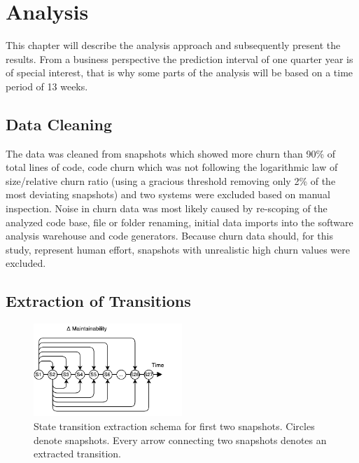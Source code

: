 \section{Analysis}
\label{sec:analysis}
This chapter will describe the analysis approach and subsequently present the results. From a business perspective the prediction interval of one quarter year is of special interest, that is why some parts of the analysis will be based on a time period of 13 weeks.

\subsection{Data Cleaning}
The data was cleaned from snapshots which showed more churn than 90\% of total lines of code, code churn which was not following the logarithmic law of size/relative churn ratio (using a gracious threshold removing only 2\% of the most deviating snapshots) and two systems were excluded based on manual inspection. Noise in churn data was most likely caused by re-scoping of the analyzed code base, file or folder renaming, initial data imports into the software analysis warehouse and code generators. Because churn data should, for this study, represent human effort, snapshots with unrealistic high churn values were excluded.

\subsection{Extraction of Transitions}

\begin{figure}[htbp!]
  \label{schema}
  \centering
  \includegraphics[width=0.50\textwidth]{figs/extraction.pdf}
  \caption{State transition extraction schema for first two snapshots. Circles denote snapshots. Every arrow connecting two snapshots denotes an extracted transition.}
\end{figure}

